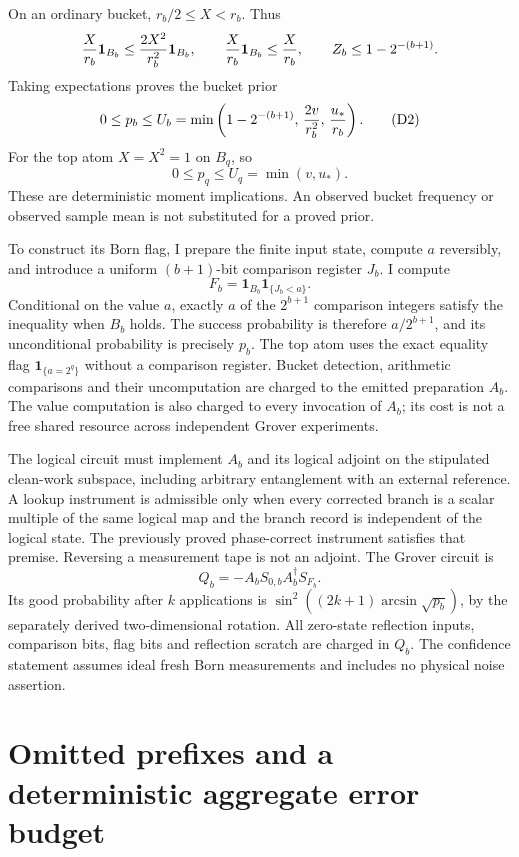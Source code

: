 On an ordinary bucket, \(r_b/2\leq X<r_b\). Thus
\[
 {X\over r_b}\mathbf1_{B_b}\leq {2X^2\over r_b^2}\mathbf1_{B_b},
 \qquad
 {X\over r_b}\mathbf1_{B_b}\leq {X\over r_b},
 \qquad
 Z_b\leq1-2^{-(b+1)}.
\]
Taking expectations proves the bucket prior
\[
 0\leq p_b\leq U_b=
 \min\left(1-2^{-(b+1)},\,{2v\over r_b^2},\,{u_*\over r_b}\right).
 \tag{D2}\label{eq:dyadic-prior}
\]
For the top atom \(X=X^2=1\) on \(B_q\), so
\[
 0\leq p_q\leq U_q=\min(v,u_*).
 \tag{D3}\label{eq:dyadic-top-prior}
\]
These are deterministic moment implications. An observed bucket frequency or observed sample mean is not substituted for a proved prior.

To construct its Born flag, I prepare the finite input state, compute \(a\) reversibly, and introduce a uniform \((b+1)\)-bit comparison register \(J_b\). I compute
\[
 F_b=\mathbf1_{B_b}\mathbf1_{\{J_b<a\}}.
\]
Conditional on the value \(a\), exactly \(a\) of the \(2^{b+1}\) comparison integers satisfy the inequality when \(B_b\) holds. The success probability is therefore \(a/2^{b+1}\), and its unconditional probability is precisely \(p_b\). The top atom uses the exact equality flag \(\mathbf1_{\{a=2^q\}}\) without a comparison register. Bucket detection, arithmetic comparisons and their uncomputation are charged to the emitted preparation \(A_b\). The value computation is also charged to every invocation of \(A_b\); its cost is not a free shared resource across independent Grover experiments.

The logical circuit must implement \(A_b\) and its logical adjoint on the stipulated clean-work subspace, including arbitrary entanglement with an external reference. A lookup instrument is admissible only when every corrected branch is a scalar multiple of the same logical map and the branch record is independent of the logical state. The previously proved phase-correct instrument satisfies that premise. Reversing a measurement tape is not an adjoint. The Grover circuit is
\[
 Q_b=-A_bS_{0,b}A_b^\dagger S_{F_b}.
\]
Its good probability after \(k\) applications is
\(\sin^2((2k+1)\arcsin\sqrt{p_b})\), by the separately derived two-dimensional rotation. All zero-state reflection inputs, comparison bits, flag bits and reflection scratch are charged in \(Q_b\). The confidence statement assumes ideal fresh Born measurements and includes no physical noise assertion.

\section{Omitted prefixes and a deterministic aggregate error budget}
\label{sec:dyadic-tail}

